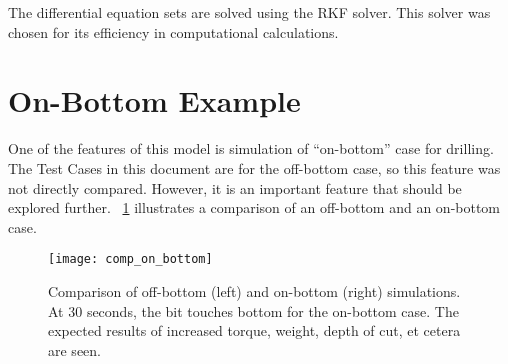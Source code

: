 \begin{mathwhere}[1.0in]
\end{mathwhere}

The differential equation sets are solved using the RKF solver. This solver was chosen for its efficiency in computational calculations.


\section{On-Bottom Example}
One of the features of this model is simulation of ``on-bottom'' case for drilling.  The Test Cases in this document are for the off-bottom case, so this feature was not directly compared.  However, it is an important feature that should be explored further. \figurename~\ref{findings} illustrates a comparison of an off-bottom and an on-bottom case.
\begin{figure}
  \centering
  \texttt{[image: comp\_on\_bottom]}
  \caption[Comparison of off-bottom and on-bottom simulations]{Comparison of off-bottom (left) and on-bottom (right) simulations.  At 30 seconds, the bit touches bottom for the on-bottom case.  The expected results of increased torque, weight, depth of cut, et cetera are seen.}\label{findings}
\end{figure} 